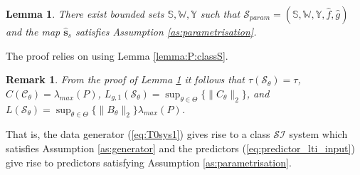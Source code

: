 \documentclass{ifacconf}
\def\eqref#1{(\ref{#1})}
\def\rvs{{\mathbf{s}}}
\def\rvw{{\mathbf{w}}}
\def\rvy{{\mathbf{y}}}
\def\vs{{\bm{s}}}
\def\vv{{\bm{v}}}
\newtheorem{lemma}{Lemma}[section]
\newtheorem{Remark}{Remark}[section]
\newcommand{\class}{\(\mathcal{SI}\)}
\begin{document}
  \begin{lemma}
  \label{classS:LTI:predictor}
    There exist bounded sets $\mathbb{S},\mathbb{W},\mathbb{Y}$ such that
    $\mathcal{S}_{param}=(\mathbb{S},\mathbb{W},\mathbb{Y},\hat{f},\hat{g})$ and the map $\hat{\rvs}_s$  satisfies Assumption \ref{as:parametrisation}.
  \end{lemma}
  The proof relies on using Lemma  \ref{lemma:P:classS}. %
  \begin{Remark}
      From the proof of Lemma \ref{classS:LTI:predictor} it follows that  $\tau(\mathcal{S}_{\theta})=\tau$, $C(\mathcal{C}_{\theta})=\lambda_{max}(P)$,  
    $L_{g,1}(\mathcal{S}_{\theta})=\sup_{\theta \in \Theta}\{\|C_{\theta}\|_{2}\}$, and $L(\mathcal{S}_{\theta})=\sup_{\theta \in \Theta}\{\|B_{\theta}\|_{2}\}\lambda_{max}(P)$.
  \end{Remark}
That is, the data generator \eqref{eq:T0sys1} gives rise to a class \class{}
system which satisfies Assumption \ref{as:generator} and the predictors \eqref{eq:predictor_lti_input}
give rise to predictors satisfying Assumption \ref{as:parametrisation}.
\end{document}
